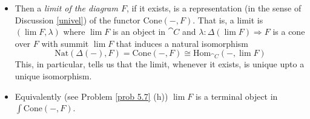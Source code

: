 \begin{discussion}
\begin{itemize}
\item Then a \emph{limit of the diagram $F$}, if it exists, is a representation (in the sense of Discussion \ref{univel}) of the functor $\mathrm{Cone}(-,F)$. That is, a limit is $(\lim F,\lambda)$ where $\lim F$ is an object in $\cat{C}$ and $\lambda: \Delta(\lim F) \Rightarrow F$ is a cone over $F$ with summit $\lim F$ that induces a natural isomorphism
\[\mathrm{Nat}(\Delta(-),F) = \mathrm{Cone}(-,F) \cong \mathrm{Hom}_{\cat{C}}(-,\lim F)\]
This, in particular, tells us that the limit, whenever it exists, is unique upto a unique isomorphism.
\item Equivalently (see Problem \ref{prob 5.7} (h)) $\lim F$ is a terminal object in $\int\mathrm{Cone}(-,F)$.
\end{itemize}
\end{discussion}

\vspace*{0.1in}

